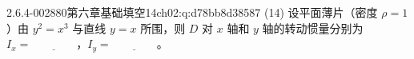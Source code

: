 \begin{q}{2.6.4-002}{880第六章基础填空14}{ch02:q:d78bb8d38587}
(14) 设平面薄片（密度 $\rho=1$）由 $y^2=x^3$ 与直线 $y=x$ 所围，则 $D$ 对 $x$ 轴和 $y$ 轴的转动惯量分别为 $I_x=\underline{\hspace{4em}}$，$I_y=\underline{\hspace{4em}}$。
\end{q}
